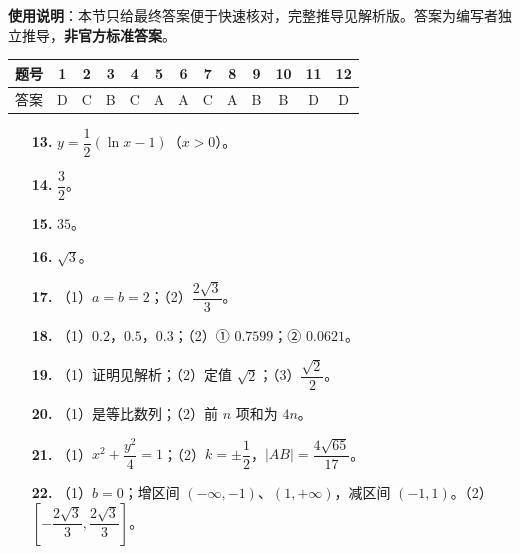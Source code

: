 
\begin{gknotice}
\textbf{使用说明}：本节只给最终答案便于快速核对，完整推导见解析版。答案为编写者独立推导，\textbf{非官方标准答案}。
\end{gknotice}

\begin{center}\begin{tabular}{ccccccccccccc}
\toprule
题号 & 1 & 2 & 3 & 4 & 5 & 6 & 7 & 8 & 9 & 10 & 11 & 12 \\
\midrule
答案 & D & C & B & C & A & A & C & A & B & B & D & D \\
\bottomrule
\end{tabular}\end{center}

\begin{itemize}[leftmargin=2.6em]
  \item[\textbf{13.}] $y=\dfrac12(\ln x-1)$（$x>0$）。
  \item[\textbf{14.}] $\dfrac32$。
  \item[\textbf{15.}] $35$。
  \item[\textbf{16.}] $\sqrt3$。
\end{itemize}

\begin{itemize}[leftmargin=2.6em]
  \item[\textbf{17.}] （1）$a=b=2$；（2）$\dfrac{2\sqrt3}3$。
  \item[\textbf{18.}] （1）$0.2$，$0.5$，$0.3$；（2）① $0.7599$；② $0.0621$。
  \item[\textbf{19.}] （1）证明见解析；（2）定值 $\sqrt2$；（3）$\dfrac{\sqrt2}2$。
  \item[\textbf{20.}] （1）是等比数列；（2）前 $n$ 项和为 $4n$。
  \item[\textbf{21.}] （1）$x^2+\dfrac{y^2}4=1$；（2）$k=\pm\dfrac12$，$\left|AB\right|=\dfrac{4\sqrt{65}}{17}$。
  \item[\textbf{22.}] （1）$b=0$；增区间 $(-\infty,-1)$、$(1,+\infty)$，减区间 $(-1,1)$。（2）$\left[-\dfrac{2\sqrt3}3,\dfrac{2\sqrt3}3\right]$。
\end{itemize}
